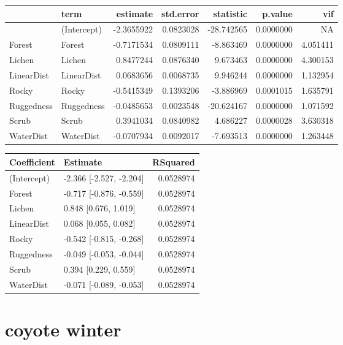 \documentclass[]{article}
\begin{document}
\begin{tabular}{llrrrrr}
\toprule
  & term & estimate & std.error & statistic & p.value & vif\\
\midrule
 & (Intercept) & -2.3655922 & 0.0823028 & -28.742565 & 0.0000000 & NA\\
Forest & Forest & -0.7171534 & 0.0809111 & -8.863469 & 0.0000000 & 4.051411\\
Lichen & Lichen & 0.8477244 & 0.0876340 & 9.673463 & 0.0000000 & 4.300153\\
LinearDist & LinearDist & 0.0683656 & 0.0068735 & 9.946244 & 0.0000000 & 1.132954\\
Rocky & Rocky & -0.5415349 & 0.1393206 & -3.886969 & 0.0001015 & 1.635791\\
Ruggedness & Ruggedness & -0.0485653 & 0.0023548 & -20.624167 & 0.0000000 & 1.071592\\
Scrub & Scrub & 0.3941034 & 0.0840982 & 4.686227 & 0.0000028 & 3.630318\\
WaterDist & WaterDist & -0.0707934 & 0.0092017 & -7.693513 & 0.0000000 & 1.263448\\
\bottomrule
\end{tabular}

\begin{tabular}{llr}
\toprule
Coefficient & Estimate & RSquared\\
\midrule
(Intercept) & -2.366 [-2.527, -2.204] & 0.0528974\\
Forest & -0.717 [-0.876, -0.559] & 0.0528974\\
Lichen & 0.848 [0.676, 1.019] & 0.0528974\\
LinearDist & 0.068 [0.055, 0.082] & 0.0528974\\
Rocky & -0.542 [-0.815, -0.268] & 0.0528974\\
Ruggedness & -0.049 [-0.053, -0.044] & 0.0528974\\
Scrub & 0.394 [0.229, 0.559] & 0.0528974\\
WaterDist & -0.071 [-0.089, -0.053] & 0.0528974\\
\bottomrule
\end{tabular}

\section{coyote winter}\label{coyote-winter}
\end{document}
